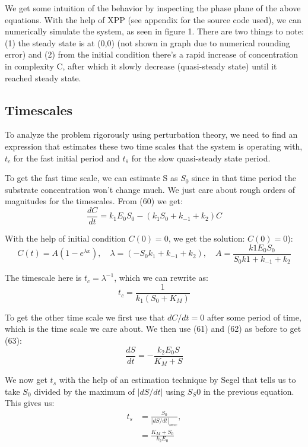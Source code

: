 \documentclass[12pt]{article}
\begin{document}
We get some intuition of the behavior by inspecting the phase plane of
the above equations. With the help of XPP (see appendix for the source
code used), we can numerically simulate the system, as seen in figure
1. There are two things to note: (1) the steady state is at (0,0) (not
shown in graph due to numerical rounding error) and (2) from the initial
condition there's a rapid increase of concentration in complexity C,
after which it slowly decrease (quasi-steady state) until it reached
steady state.

\subsection{Timescales}

To analyze the problem rigorously using perturbation theory, we need
to find an expression that estimates these two time scales that the
system is operating with, $t_c$ for the fast initial period and
$t_{\overline{s}}$ for the slow quasi-steady state period.

To get the fast time scale, we can estimate S as $S_0$ since in that
time period the substrate concentration won't change much. We just
care about rough orders of magnitudes for the timescales. From (60) we
get:
\begin{equation}
  \frac{dC}{dt} = k_1E_0 S_0 - (k_1 S_0 + k_{-1} + k_2)C
\end{equation}

With the help of initial condition $C(0)=0$, we get the solution:
$C(0)=0$):
\begin{equation}
  C(t) = A(1 -  e^{\lambda x}), \quad
  \lambda = (-S_0 k_1 + k_{-1} + k_2), \quad
  A =\frac{k1 E_0 S_0}{S_0 k1 + k_{-1} + k_2}
\end{equation}

The timescale here is $t_c = \lambda^{-1}$, which we can rewrite as:
\begin{equation}
  t_c = \frac{1}{k_1(S_0+K_M)}
\end{equation}

To get the other time scale we first use that $dC/dt = 0$ after some
period of time, which is the time scale we care about. We then use
(61) and (62) as before to get (63):
\begin{equation}
  \frac{dS}{dt} = -\frac{k_2 E_0 S}{K_M + S}
\end{equation}

We now get $t_s$ with the help of an estimation technique by Segel
\cite{segel1984modeling} that tells us to take $S_0$ divided by the
maximum of $|dS/dt|$ using $S_S0$ in the previous equation. This gives
us:
\begin{align}
  t_s &= \frac{S_0}{|dS/dt|_{max}}, \\
      &= \frac{K_M + S_0}{k_2 E_0}
\end{align}
\end{document}
